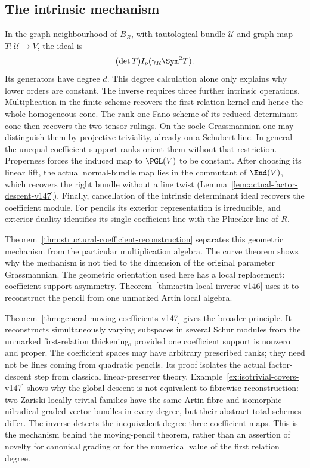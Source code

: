 \subsection{The intrinsic mechanism}
In the graph neighbourhood of \(B_R\), with tautological bundle
\(\mathcal U\) and graph map \(T:\mathcal U\to V\), the ideal is
\[
                 (\det T)I_p(\gamma_R\Sym^2T).
\]
Its generators have degree \(d\).  This degree calculation alone
only explains why lower orders are constant.  The inverse requires
three further intrinsic operations.  Multiplication in the finite
scheme recovers the first relation kernel and hence the whole
homogeneous cone.  The rank-one Fano scheme of its reduced determinant
cone then recovers the two tensor rulings.  On the socle Grassmannian
one may distinguish them by projective triviality, already on a
Schubert line.  In general the unequal coefficient-support ranks
orient them without that restriction.  Properness forces the induced
map to \(\PGL(V)\) to be constant.  After choosing its linear lift,
the actual normal-bundle map lies in the commutant of \(\End(V)\),
which recovers the right bundle without a line twist
(Lemma~\ref{lem:actual-factor-descent-v147}).  Finally, cancellation of the intrinsic
determinant ideal recovers the coefficient module.  For pencils its
exterior representation is irreducible, and exterior duality identifies
its single coefficient line with the Pluecker line of \(R\).

Theorem~\ref{thm:structural-coefficient-reconstruction} separates this
geometric mechanism from the particular multiplication algebra.  The
curve theorem shows why the mechanism is not tied to the dimension of
the original parameter Grassmannian.  The geometric orientation used here has a local replacement: coefficient-support asymmetry.  Theorem~\ref{thm:artin-local-inverse-v146} uses it to reconstruct the pencil from one unmarked Artin local algebra.

Theorem~\ref{thm:general-moving-coefficients-v147} gives the broader
principle.  It reconstructs simultaneously varying subspaces in
several Schur modules from the unmarked first-relation thickening,
provided one coefficient support is nonzero and proper.  The
coefficient spaces may have arbitrary prescribed ranks; they need
not be lines coming from quadratic pencils.  Its proof isolates the
actual factor-descent step from classical linear-preserver theory.
Example~\ref{ex:isotrivial-covers-v147} shows why the global descent is
not equivalent to fibrewise reconstruction: two Zariski locally
trivial families have the same Artin fibre and isomorphic nilradical
graded vector bundles in every degree, but their abstract total
schemes differ.  The inverse detects the inequivalent degree-three
coefficient maps.  This is the mechanism behind the moving-pencil
theorem, rather than
an assertion of novelty for canonical grading or for the numerical
value of the first relation degree.


